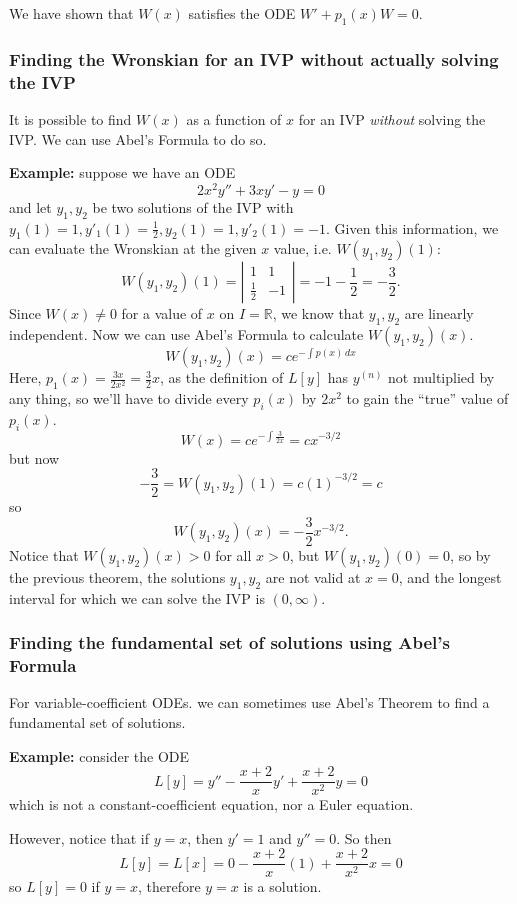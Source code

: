\documentclass[11pt]{article}
\newcommand{\example}{\textbf{Example: }}
\newcommand{\dx}{\,dx} %
\begin{document}
	We have shown that $W(x)$ satisfies the ODE $W' + p_1 (x) W = 0$.

\subsubsection{Finding the Wronskian for an IVP without actually solving the IVP}
	It is possible to find $W(x)$ as a function of $x$ for an IVP \emph{without} solving the IVP. We can use Abel's Formula to do so.

	\example suppose we have an ODE
		$$ 2x^2 y'' + 3x y' - y = 0 $$
	and let $y_1, y_2$ be two solutions of the IVP with $y_1 (1) = 1, y'_1 (1) = \frac{1}{2}, y_2 (1) = 1, y'_2 (1) = -1$. Given this information, we can evaluate the Wronskian at the given $x$ value, i.e. $W(y_1, y_2)(1)$:
		$$ W(y_1, y_2)(1) =
			\left|
				\begin{array}{cc}
					1 & 1 \\
					\frac{1}{2} & -1
				\end{array}
			\right| = -1 - \frac{1}{2} = - \frac{3}{2}.
		$$
	Since $W(x) \neq 0$ for a value of $x$ on $I = \mathbb{R}$, we know that $y_1, y_2$ are linearly independent. Now we can use Abel's Formula to calculate $W(y_1, y_2)(x)$.
		$$ W(y_1, y_2)(x) = c e^{- \int p(x)\dx} $$
	Here, $p_1 (x) = \frac{3x}{2x^2} = \frac{3}{2} x$, as the definition of $L[y]$ has $y^{(n)}$ not multiplied by any thing, so we'll have to divide every $p_i(x)$ by $2x^2$ to gain the ``true'' value of $p_i(x)$.
		$$ W(x) = c e^{-\int \frac{3}{2x}} = c x^{- 3/2} $$
	but now
		$$ -\frac{3}{2} = W(y_1, y_2) (1) = c (1)^{- 3 / 2} = c $$
	so
		$$ W(y_1, y_2)(x) = -\frac{3}{2} x^{-3/2}. $$
	Notice that $W(y_1, y_2)(x) > 0$ for all $x > 0$, but $W(y_1, y_2)(0) = 0$, so by the previous theorem, the solutions $y_1, y_2$ are not valid at $x = 0$, and the longest interval for which we can solve the IVP is $(0, \infty)$.

\subsubsection{Finding the fundamental set of solutions using Abel's Formula}
	For variable-coefficient ODEs. we can sometimes use Abel's Theorem to find a fundamental set of solutions.

	\example consider the ODE
		$$ L[y] = y'' - \frac{x + 2}{x} y' + \frac{x + 2}{x^2} y = 0 $$
	which is not a constant-coefficient equation, nor a Euler equation.

	However, notice that if $y = x$, then $y' = 1$ and $y'' = 0$. So then
		$$ L[y] = L[x] = 0 - \frac{x+2}{x} (1) + \frac{x+2}{x^2} x = 0 $$
	so $L[y] = 0$ if $y = x$, therefore $y = x$ is a solution.
\end{document}
